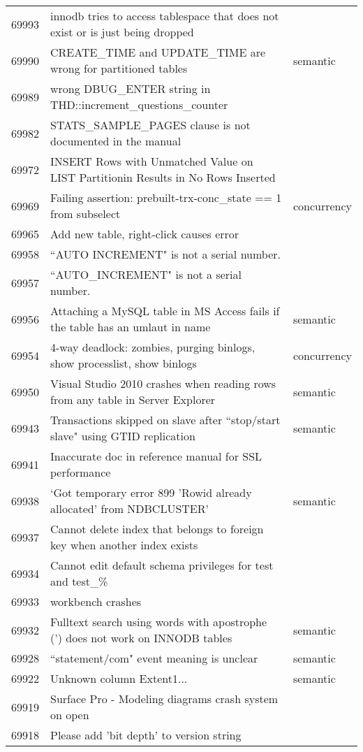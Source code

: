 \begin{longtable}[c]{p{1cm}p{8cm}p{3cm}}
69993 & innodb tries to access tablespace that does not exist or is just being dropped &  \\
69990 & CREATE\_TIME and UPDATE\_TIME are wrong for partitioned tables & semantic \\
69989 & wrong DBUG\_ENTER string in THD::increment\_questions\_counter &  \\
69982 & STATS\_SAMPLE\_PAGES clause is not documented in the manual &  \\
69972 & INSERT Rows with Unmatched Value on LIST Partitionin Results in No Rows Inserted &  \\
69969 & Failing assertion: prebuilt-trx-conc\_state == 1 from subselect & concurrency \\
69965 & Add new table, right-click causes error &  \\
69958 & ``AUTO INCREMENT" is not a serial number. &  \\
69957 & ``AUTO\_INCREMENT" is not a serial number. &  \\
69956 & Attaching a MySQL table in MS Access fails if the table has an umlaut in name & semantic \\
69954 & 4-way deadlock: zombies, purging binlogs, show processlist, show binlogs & concurrency \\
69950 & Visual Studio 2010 crashes when reading rows from any table in Server Explorer & semantic \\
69943 & Transactions skipped on slave after ``stop/start slave" using GTID replication & semantic \\
69941 & Inaccurate doc in reference manual for SSL performance &  \\
69938 & `Got temporary error 899 'Rowid already allocated' from NDBCLUSTER' & semantic \\
69937 & Cannot delete index that belongs to foreign key when another index exists &  \\
69934 & Cannot edit default schema privileges for test and test\_\% &  \\
69933 & workbench crashes &  \\
69932 & Fulltext search using words with apostrophe (') does not work on INNODB tables & semantic \\
69928 & ``statement/com" event meaning is unclear & semantic \\
69922 & Unknown column Extent1... & semantic \\
69919 & Surface Pro - Modeling diagrams crash system on open &  \\
69918 & Please add 'bit depth' to version string &  \\

\end{longtable}
